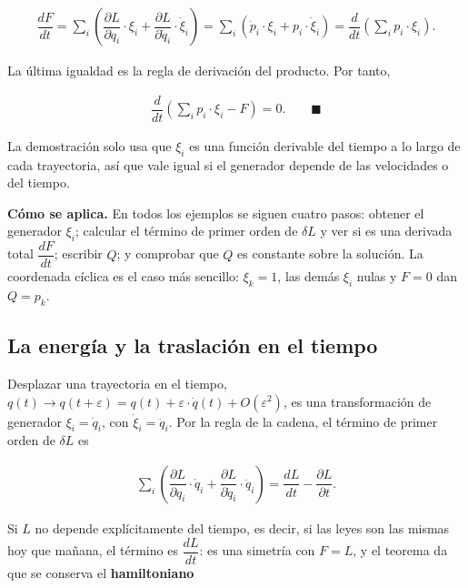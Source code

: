 \documentclass[11pt,a4paper,spanish]{book}
\begin{document}
\[
\begin{aligned}
\dfrac{dF}{dt} = \sum_i \left( \dfrac{\partial L}{\partial q_i} \cdot \xi_i + \dfrac{\partial L}{\partial \dot{q}_i} \cdot \dot{\xi}_i \right) = \sum_i \left( \dot{p}_i \cdot \xi_i + p_i \cdot \dot{\xi}_i \right) = \dfrac{d}{dt}\left( \sum_i p_i \cdot \xi_i \right).
\end{aligned}
\]

La última igualdad es la regla de derivación del producto. Por tanto,

\[
\begin{aligned}
\dfrac{d}{dt}\left(\sum_i p_i \cdot \xi_i - F\right) = 0. \qquad \blacksquare
\end{aligned}
\]

La demostración solo usa que \(\xi_i\) es una función derivable del
tiempo a lo largo de cada trayectoria, así que vale igual si el
generador depende de las velocidades o del tiempo.

\textbf{Cómo se aplica.} En todos los ejemplos se siguen cuatro pasos:
obtener el generador \(\xi_i\); calcular el término de primer orden de
\(\delta L\) y ver si es una derivada total \(\dfrac{dF}{dt}\); escribir
\(Q\); y comprobar que \(Q\) es constante sobre la solución. La
coordenada cíclica es el caso más sencillo: \(\xi_k = 1\), las demás
\(\xi_i\) nulas y \(F = 0\) dan \(Q = p_k\).

\subsection{La energía y la traslación en el
tiempo}\label{la-energuxeda-y-la-traslaciuxf3n-en-el-tiempo}

Desplazar una trayectoria en el tiempo,
\(q(t) \to q(t + \varepsilon) = q(t) + \varepsilon \cdot \dot{q}(t) + O(\varepsilon^2)\),
es una transformación de generador \(\xi_i = \dot{q}_i\), con
\(\dot{\xi}_i = \ddot{q}_i\). Por la regla de la cadena, el término de
primer orden de \(\delta L\) es

\[
\begin{aligned}
\sum_i \left( \dfrac{\partial L}{\partial q_i} \cdot \dot{q}_i + \dfrac{\partial L}{\partial \dot{q}_i} \cdot \ddot{q}_i \right) = \dfrac{dL}{dt} - \dfrac{\partial L}{\partial t}.
\end{aligned}
\]

Si \(L\) no depende explícitamente del tiempo, es decir, si las leyes
son las mismas hoy que mañana, el término es \(\dfrac{dL}{dt}\): es una
simetría con \(F = L\), y el teorema da que se conserva el
\textbf{hamiltoniano}
\end{document}
